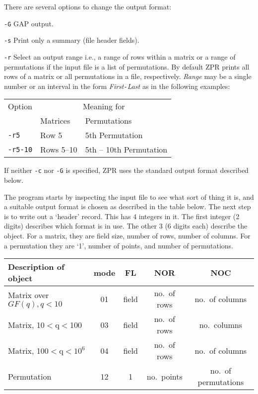 There are several options to change the output format:
\begin{list}{}{\parsep 0mm \itemsep 0mm}
\item[\tt-G]	GAP output.
\item[\tt-s]	Print only a summary (file header fields).
\item[\tt-r]	Select an output range i.e., a range of rows within a
		matrix or a range of permutations if the input file is
		a list of permutations. By default ZPR prints all
                rows of a matrix or all permutations in a file,
                respectively. {\it Range} may be a single number or
		an interval in the form {\it First}{\tt-}{\it Last}
		as in the following examples:
		\begin{list}{}{}
		\item\begin{tabular}{|l|l|l|}
                  \hline
		  Option&\multicolumn{2}{c|}{Meaning for}\\
			& Matrices & Permutations \\
		  \hline
		  \tt -r5& Row 5 & 5th Permutation \\
                  \hline
                  \tt -r5-10&Rows 5--10 & 5th -- 10th Permutation\\
                  \hline
		\end{tabular}\end{list}
\end{list}
If neither {\tt-c} nor {\tt-G} is specified, ZPR uses the standard
output format described below.

The program starts by inspecting the input file to see what sort of
thing it is, and a suitable output format is chosen as described in
the table below. The next step is to write out a `header' record.
This has 4 integers in it.  The first integer (2 digits) describes
which format is in use. The other 3 (6 digits each) describe the
object.  For a matrix, they are field size, number of rows, number
of columns. For a permutation they are `1', number of points, and
number of permutations.
\begin{center}
\begin{tabular}{|l|c|c|c|c|}
\hline
Description of object    &mode&   FL  &      NOR     &    NOC \\
\hline
Matrix over $GF(q),q<10$  &01&  field &no.\ of rows&no.\ of columns\\
Matrix, 10$<$q$<$100      &03&  field &no.\ of rows&no.\ columns\\
Matrix, 100$<$q$<10^6$    &04&  field &no.\ of rows&no.\ of columns\\
Permutation               &12&   1   &no.\ points&no.\ of permutations\\
\hline
\end{tabular}
\end{center}

